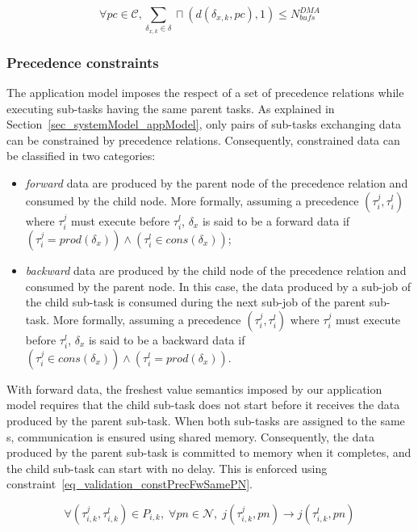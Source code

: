 \documentclass[main.tex]{subfiles}
\begin{document}
\begin{equation}
    \label{eq_validation_consPcUtilDDMA}
    \forall pc \in \mathcal{C} , 
    \sum_{\delta_{x,k} \in \delta} \sqcap ( d(\delta_{x,k} , pc) , 1 ) \leq N_{bufs}^{DMA}
\end{equation}

\subsubsection{Precedence constraints}
The application model imposes the respect of a set of precedence relations while executing sub-tasks having the same parent tasks. As explained in Section~\ref{sec_systemModel_appModel}, only pairs of sub-tasks exchanging data can be constrained by precedence relations. Consequently, constrained data can be classified in two categories:
\begin{itemize}
    \item \emph{forward} data are produced by the parent node of the precedence relation and consumed by the child node. More formally, assuming a precedence $(\tau_i^j , \tau_i^l )$ where $\tau_i^j$ must execute before $\tau_i^l$, $\delta_x$ is said to be a forward data if $(\tau_i^j = prod(\delta_x)) \land (\tau_i^l \in cons(\delta_x))$;
    \item \emph{backward} data are produced by the child node of the precedence relation and consumed by the parent node. In this case, the data produced by a sub-job of the child sub-task is consumed during the next sub-job of the parent sub-task. More formally, assuming a precedence $(\tau_i^j , \tau_i^l )$ where $\tau_i^j$ must execute before $\tau_i^l$, $\delta_x$ is said to be a backward data if $(\tau_i^j \in cons(\delta_x)) \land (\tau_i^l = prod(\delta_x))$.
\end{itemize}

With forward data, the freshest value semantics imposed by our application model requires that the child sub-task does not start before it receives the data produced by the parent sub-task. When both sub-tasks are assigned to the same \PN{}s, communication is ensured using shared memory. Consequently, the data produced by the parent sub-task is committed to memory when it completes, and the child sub-task can start with no delay. This is enforced using constraint~\ref{eq_validation_constPrecFwSamePN}.

\begin{equation}
    \label{eq_validation_constPrecFwSamePN}
    \forall (\tau_{i,k}^j , \tau_{i,k}^l) \in P_{i,k}, \; \forall pn \in \mathcal{N} , \; 
    j( \tau_{i,k}^j , pn ) \to j( \tau_{i,k}^l , pn )
\end{equation}
\end{document}

